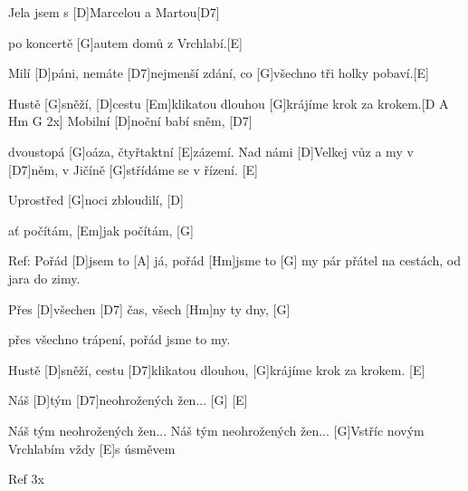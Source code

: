
Jela jsem s [D]Marcelou a Martou[D7]

po koncertě [G]autem domů z Vrchlabí.[E]

Milí [D]páni, nemáte [D7]nejmenší zdání,
co [G]všechno tři holky pobaví.[E]


Hustě [G]sněží, [D]cestu [Em]klikatou dlouhou
[G]krájíme krok za krokem.[D A Hm G 2x]\null
Mobilní [D]noční babí sněm, [D7]

dvoustopá [G]oáza, čtyřtaktní [E]zázemí.
Nad námi [D]Velkej vůz a my v [D7]něm, 
v Jičíně [G]střídáme se v řízení. [E]


Uprostřed [G]noci zbloudilí, [D]

ať počítám, [Em]jak počítám, [G]

\slpc
Ref: Pořád [D]jsem to [A] já,
pořád [Hm]jsme to [G] my
pár přátel na cestách,
od jara do zimy.

Přes [D]všechen [D7] čas,
všech [Hm]ny ty dny, [G]

přes všechno trápení,
pořád jsme to my.

Hustě [D]sněží, cestu [D7]klikatou dlouhou,
[G]krájíme krok za krokem. [E]

Náš [D]tým [D7]neohrožených žen... [G] [E]

Náš tým neohrožených žen...
Náš tým neohrožených žen...
[G]Vstříc novým Vrchlabím
vždy [E]s úsměvem

Ref 3x




